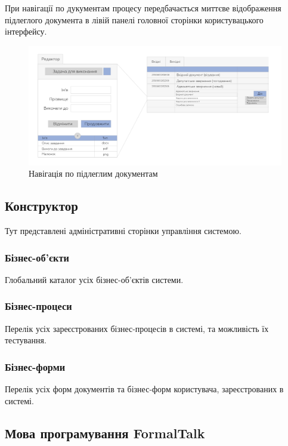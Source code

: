 При навігації по дукументам процесу передбачається миттєве відображення підлеглого
документа в лівій панелі головної сторінки користувацького інтерфейсу.

\begin{figure}[!htbp]
\centerline{\includegraphics[scale=0.4]{searchBpe.png}}
\caption{Навігація по підлеглим документам}
\end{figure}

\newpage
\subsection{Конструктор}

Тут представлені адміністративні сторінки управління системою.

\subsubsection{Бізнес-об'єкти}

Глобальний каталог усіх бізнес-об'єктів системи.

\subsubsection{Бізнес-процеси}

Перелік усіх зареєстрованих бізнес-процесів в системі, та можливість їх тестування.

\subsubsection{Бізнес-форми}

Перелік усіх форм документів та бізнес-форм користувача, зареєстрованих в системі.

\subsection{Мова програмування FormalTalk}


